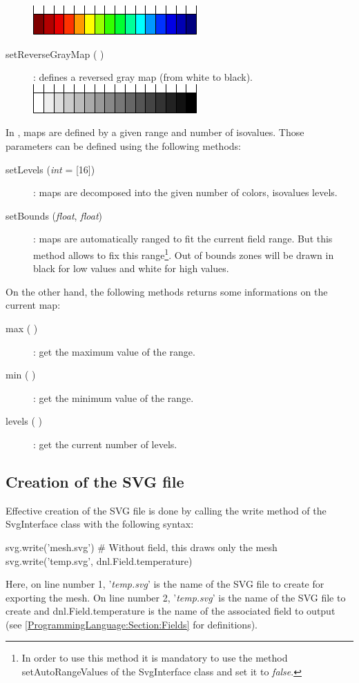 \begin{description}
 \hspace*{0.2\columnwidth}\includegraphics{Figures/ProgrammingLanguage/ReverseDeepColorMap}
\item [{setReverseGrayMap ( )}] : defines a reversed gray map (from white to black).\\
 \hspace*{0.2\columnwidth}\includegraphics{Figures/ProgrammingLanguage/ReverseGrayMap}
\end{description}

In \DynELA, maps are defined by a given range and number of isovalues. Those parameters can be defined using the following methods:
\begin{description}
\item [{setLevels (\emph{int} = [16]})] : maps are decomposed into the given number of colors, \ie isovalues levels.
\item [{setBounds (\emph{float}, \emph{float})}] : maps are automatically ranged to fit the current field range. But this method allows to fix this range\footnote{In order to use this method it is mandatory to use the method \textsf{setAutoRangeValues} of the \textsf{SvgInterface} class and set it to \emph{false}.}. Out of bounds zones will be drawn in black for low values and white for high values.
\end{description}

On the other hand, the following methods returns some informations on the current map:
\begin{description}
\item [{max ( )}] : get the maximum value of the range.
\item [{min ( )}] : get the minimum value of the range.
\item [{levels ( )}] : get the current number of levels.
\end{description}

\subsection{Creation of the SVG file}
Effective creation of the SVG file is done by calling the \textsf{write} method of the \textsf{SvgInterface} class with the following syntax:
\begin{PythonListing}
svg.write('mesh.svg') # Without field, this draws only the mesh
svg.write('temp.svg', dnl.Field.temperature)
\end{PythonListing}
Here, on line number 1, '\emph{temp.svg}' is the name of the SVG file to create for exporting the mesh. On line number 2, '\emph{temp.svg}' is the name of the SVG file to create and \textsf{dnl.Field.temperature} is the name of the associated field to output (see \ref{ProgrammingLanguage:Section:Fields} for definitions).
